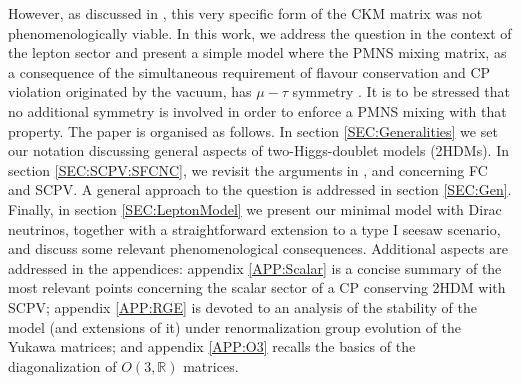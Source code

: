 \documentclass[12pt,a4paper]{article}
\begin{document}
However, as discussed in \cite{Ecker:1987md}, this very specific form of the CKM matrix was not phenomenologically viable. In this work, we address the question in the context of the lepton sector and present a simple model where the PMNS mixing matrix, as a consequence of the simultaneous requirement of flavour conservation and CP violation originated by the vacuum, has $\mu-\tau$ symmetry \cite{Harrison:2002et}. It is to be stressed that no additional symmetry is involved in order to enforce a PMNS mixing with that property. The paper is organised as follows. In section \ref{SEC:Generalities} we set our notation discussing general aspects of two-Higgs-doublet models (2HDMs). In section \ref{SEC:SCPV:SFCNC}, we revisit the arguments in \cite{Branco:1979pv}, \cite{Ecker:1987md} and \cite{Gronau:1987xz} concerning FC and SCPV. A general approach to the question is addressed in section \ref{SEC:Gen}. Finally, in section \ref{SEC:LeptonModel} we present our minimal model with Dirac neutrinos, together with a straightforward extension to a type I seesaw scenario, and discuss some relevant phenomenological consequences. Additional aspects are addressed in the appendices: appendix \ref{APP:Scalar} is a concise summary of the most relevant points concerning the scalar sector of a CP conserving 2HDM with SCPV; appendix \ref{APP:RGE} is devoted to an analysis of the stability of the model (and extensions of it) under renormalization group evolution of the Yukawa matrices; and appendix \ref{APP:O3} recalls the basics of the diagonalization of $O(3,\mathbb{R})$ matrices.

\end{document}
